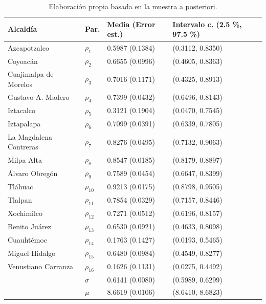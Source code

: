 \documentclass[11pt]{article}
\begin{document}
\begin{table}[H]
\caption{Elaboración propia basada en la muestra \underline{a posteriori}.}
\label{tab:estimaciones}
\centering
\begin{tabular}{l|l|l|l}
\hline
Alcaldía & Par. & {Media (Error est.)} & {Intervalo c. (2.5 \%, 97.5 \%)}  \\
\hline
Azcapotzalco & $\rho_{1}$ & 0.5987 (0.1384) & (0.3112, 0.8350)\\
\hline
Coyoacán & $\rho_{2}$ & 0.6655 (0.0996) & (0.4605, 0.8363)\\
\hline
Cuajimalpa de Morelos & $\rho_{3}$ & 0.7016 (0.1171) & (0.4325, 0.8913)\\
\hline
Gustavo A. Madero & $\rho_{4}$ & 0.7399 (0.0432) & (0.6496, 0.8143)\\
\hline
Iztacalco & $\rho_{5}$ & 0.3121 (0.1904) & (0.0470, 0.7545)\\
\hline
Iztapalapa & $\rho_{6}$ & 0.7099 (0.0391) & (0.6339, 0.7805)\\
\hline
La Magdalena Contreras & $\rho_{7}$ & 0.8276 (0.0495) & (0.7132, 0.9063)\\
\hline
Milpa Alta & $\rho_{8}$ & 0.8547 (0.0185) & (0.8179, 0.8897)\\
\hline
Álvaro Obregón & $\rho_{9}$ & 0.7589 (0.0454) & (0.6647, 0.8399)\\
\hline
Tláhuac & $\rho_{10}$ & 0.9213 (0.0175) & (0.8798, 0.9505)\\
\hline
Tlalpan & $\rho_{11}$ & 0.7854 (0.0329) & (0.7157, 0.8446)\\
\hline
Xochimilco & $\rho_{12}$ & 0.7271 (0.0512) & (0.6196, 0.8157)\\
\hline
Benito Juárez & $\rho_{13}$ & 0.6530 (0.0921) & (0.4633, 0.8098)\\
\hline
Cuauhtémoc & $\rho_{14}$ & 0.1763 (0.1427) & (0.0193, 0.5465)\\
\hline
Miguel Hidalgo & $\rho_{15}$ & 0.6480 (0.0984) & (0.4549, 0.8277)\\
\hline
Venustiano Carranza & $\rho_{16}$ & 0.1626 (0.1131) & (0.0275, 0.4492)\\
\hline
 & $\sigma$ & 0.6141 (0.0080) & (0.5989, 0.6299)\\
\hline
 & $\mu$ & 8.6619 (0.0106) & (8.6410, 8.6823)\\
\hline
\end{tabular}
\end{table}

\end{document}
